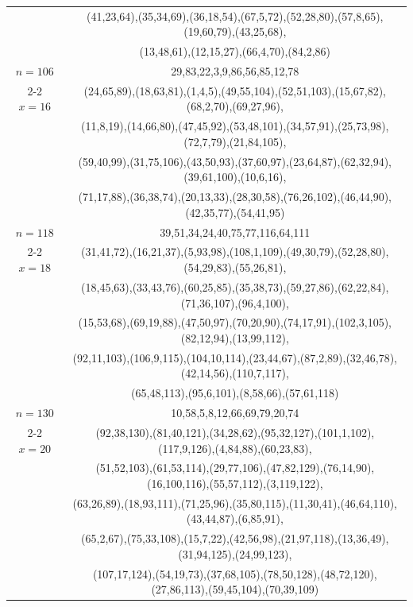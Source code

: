 \begin{tabular}{| c | c |}
&(41,23,64),(35,34,69),(36,18,54),(67,5,72),(52,28,80),(57,8,65),(19,60,79),(43,25,68),\\
&(13,48,61),(12,15,27),(66,4,70),(84,2,86)\\
\hline 
\(n=106\) & 
29,83,22,3,9,86,56,85,12,78\\
\cline{2-2}
\(x=16\)
&(24,65,89),(18,63,81),(1,4,5),(49,55,104),(52,51,103),(15,67,82),(68,2,70),(69,27,96),\\
&(11,8,19),(14,66,80),(47,45,92),(53,48,101),(34,57,91),(25,73,98),(72,7,79),(21,84,105),\\
&(59,40,99),(31,75,106),(43,50,93),(37,60,97),(23,64,87),(62,32,94),(39,61,100),(10,6,16),\\
&(71,17,88),(36,38,74),(20,13,33),(28,30,58),(76,26,102),(46,44,90),(42,35,77),(54,41,95)\\
\hline 
\(n=118\) & 
39,51,34,24,40,75,77,116,64,111\\
\cline{2-2}
\(x=18\)
&(31,41,72),(16,21,37),(5,93,98),(108,1,109),(49,30,79),(52,28,80),(54,29,83),(55,26,81),\\
&(18,45,63),(33,43,76),(60,25,85),(35,38,73),(59,27,86),(62,22,84),(71,36,107),(96,4,100),\\
&(15,53,68),(69,19,88),(47,50,97),(70,20,90),(74,17,91),(102,3,105),(82,12,94),(13,99,112),\\
&(92,11,103),(106,9,115),(104,10,114),(23,44,67),(87,2,89),(32,46,78),(42,14,56),(110,7,117),\\
&(65,48,113),(95,6,101),(8,58,66),(57,61,118)\\
\hline 
\(n=130\) & 
10,58,5,8,12,66,69,79,20,74\\
\cline{2-2}
\(x=20\)
&(92,38,130),(81,40,121),(34,28,62),(95,32,127),(101,1,102),(117,9,126),(4,84,88),(60,23,83),\\
&(51,52,103),(61,53,114),(29,77,106),(47,82,129),(76,14,90),(16,100,116),(55,57,112),(3,119,122),\\
&(63,26,89),(18,93,111),(71,25,96),(35,80,115),(11,30,41),(46,64,110),(43,44,87),(6,85,91),\\
&(65,2,67),(75,33,108),(15,7,22),(42,56,98),(21,97,118),(13,36,49),(31,94,125),(24,99,123),\\
&(107,17,124),(54,19,73),(37,68,105),(78,50,128),(48,72,120),(27,86,113),(59,45,104),(70,39,109)\\
\hline 
\end{tabular}